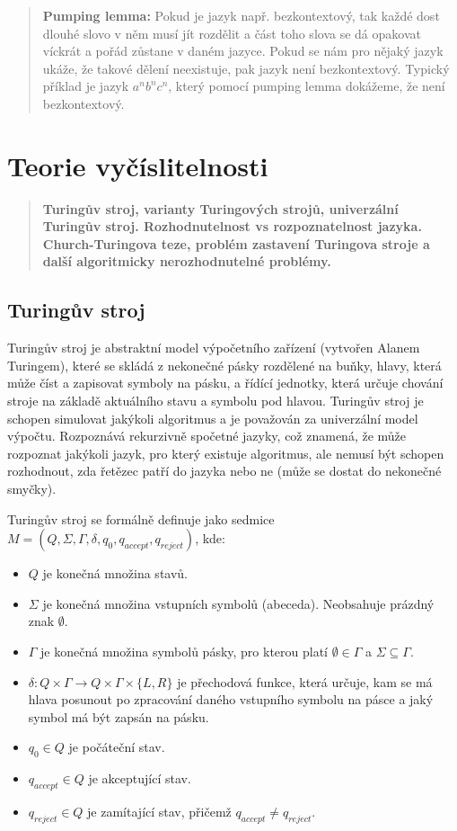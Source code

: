 \begin{quote}
\textbf{Pumping lemma:} 
Pokud je jazyk např. bezkontextový, tak každé dost dlouhé slovo v něm musí jít 
rozdělit a část toho slova se dá opakovat víckrát a pořád zůstane v daném jazyce. 
Pokud se nám pro nějaký jazyk ukáže, že takové dělení neexistuje, pak jazyk není 
bezkontextový. Typický příklad je jazyk {$a^nb^nc^n$}, který pomocí pumping lemma dokážeme, 
že není bezkontextový.
\end{quote}

\section{Teorie vyčíslitelnosti}
\begin{quote}
\textbf{Turingův stroj, varianty Turingových strojů, univerzální Turingův stroj. Rozhodnutelnost vs rozpoznatelnost jazyka. Church-Turingova teze, problém zastavení Turingova stroje a další algoritmicky nerozhodnutelné problémy.}
\end{quote}

\subsection{Turingův stroj}
Turingův stroj je abstraktní model výpočetního zařízení (vytvořen Alanem Turingem), které se skládá z nekonečné 
pásky rozdělené na buňky, hlavy, která může číst a zapisovat symboly na pásku, a 
řídící jednotky, která určuje chování stroje na základě aktuálního stavu a symbolu 
pod hlavou. Turingův stroj je schopen simulovat jakýkoli algoritmus a je považován za 
univerzální model výpočtu. Rozpoznává rekurzivně spočetné jazyky, což znamená, že může 
rozpoznat jakýkoli jazyk, pro který existuje algoritmus, ale nemusí být schopen 
rozhodnout, zda řetězec patří do jazyka nebo ne (může se dostat do nekonečné smyčky).

Turingův stroj se formálně definuje jako sedmice $M = (Q, \Sigma, \Gamma, \delta, q_0, q_{accept}, q_{reject})$, kde:
\begin{itemize}
\item $Q$ je konečná množina stavů.
\item $\Sigma$ je konečná množina vstupních symbolů (abeceda). Neobsahuje prázdný znak $\emptyset$.
\item $\Gamma$ je konečná množina symbolů pásky, pro kterou platí $\emptyset \in \Gamma$ a $\Sigma \subseteq \Gamma$.
\item $\delta: Q \times \Gamma \to Q \times \Gamma \times \{L, R\}$ je přechodová 
funkce, která určuje, kam se má hlava posunout po 
zpracování daného vstupního symbolu na pásce a jaký symbol má být zapsán na pásku.
\item $q_0 \in Q$ je počáteční stav.
\item $q_{accept} \in Q$ je akceptující stav.
\item $q_{reject} \in Q$ je zamítající stav, přičemž $q_{accept} \neq q_{reject}$.
\end{itemize}

